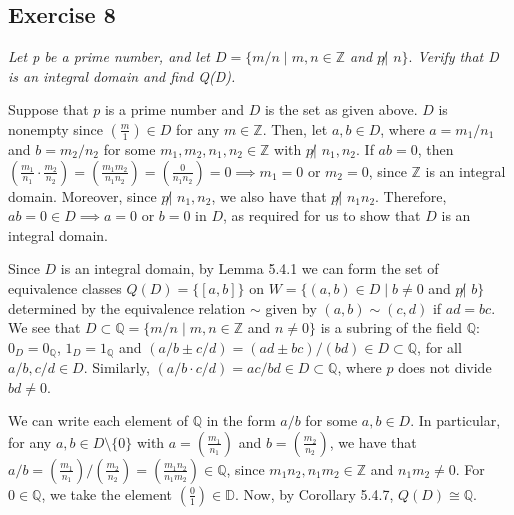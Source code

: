 \subsection*{Exercise 8}
\textit{Let p be a prime number, and let $D = \{m/n \mid m,n \in \mathbb{Z}$ and $p \not|$ $n \}.$ Verify that D is an integral domain and find Q(D).}

\vspace{5 mm}
Suppose that $p$ is a prime number and $D$ is the set as given above. $D$ is nonempty since $(\frac{m}{1}) \in D$ for any $m \in \mathbb{Z}$. Then, let $a,b \in D$, where $a = m_1/n_1$ and $b = m_2/n_2$ for some $m_1,m_2,n_1,n_2 \in \mathbb{Z}$ with $p \not|$ $n_1,n_2$. If $ab = 0$, then $(\frac{m_1}{n_1}\cdot\frac{m_2}{n_2}) = (\frac{m_1m_2}{n_1n_2}) = (\frac{0}{n_1n_2}) = 0 \implies m_1 = 0$ or $m_2 = 0$, since $\mathbb{Z}$ is an integral domain. Moreover, since $p \not|$ $n_1,n_2$, we also have that $p \not|$ $n_1n_2$. Therefore, $ab = 0 \in D \implies a = 0$ or $b = 0$ in $D$, as required for us to show that $D$ is an integral domain.

Since $D$ is an integral domain, by Lemma 5.4.1 we can form the set of equivalence classes $Q(D) = \{[a,b]\}$ on $W = \{(a,b) \in D \mid b \not= 0$ and $p \not|$ $b \}$ determined by the equivalence relation $\sim$ given by $(a,b) \sim (c,d)$ if $ad = bc$. We see that $D \subset \mathbb{Q} = \{ m/n \mid m,n \in \mathbb{Z}$ and $n \not= 0 \}$ is a subring of the field $\mathbb{Q}$: $0_D = 0_\mathbb{Q}$, $1_D = 1_\mathbb{Q}$ and $(a/b \pm c/d) = (ad \pm bc)/(bd) \in D\subset \mathbb{Q}$, for all $a/b, c/d \in D$. Similarly, $(a/b \cdot c/d) = ac/bd \in D \subset \mathbb{Q}$, where $p$ does not divide $bd \not= 0$.

We can write each element of $\mathbb{Q}$ in the form $a/b$ for some $a,b \in D$. In particular, for any $a,b \in D\setminus\{0\}$ with $a = (\frac{m_1}{n_1})$ and $b = (\frac{m_2}{n_2})$, we have that $a/b = (\frac{m_1}{n_1})/(\frac{m_2}{n_2}) = (\frac{m_1n_2}{n_1m_2}) \in \mathbb{Q}$, since $m_1n_2, n_1m_2 \in \mathbb{Z}$ and $n_1m_2 \not= 0$. For $0 \in \mathbb{Q}$, we take the element $(\frac{0}{1}) \in \mathbb{D}$. Now, by Corollary 5.4.7, $Q(D) \cong \mathbb{Q}$.